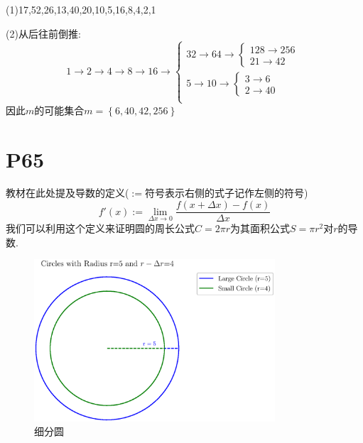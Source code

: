 \documentclass{book}
\begin{document}
    \vspace{2em}

    (1)17,52,26,13,40,20,10,5,16,8,4,2,1

    (2)从后往前倒推:$$1\rightarrow 2\rightarrow 4\rightarrow 8\rightarrow 16\rightarrow \left\{\begin{matrix}
            32\rightarrow 64\rightarrow  \left\{\begin{matrix}
                                                    128\rightarrow 256 \\
                                                    21\rightarrow 42
                                                \end{matrix}\right. \\
            5\rightarrow 10\rightarrow \left\{\begin{matrix}
                                                  3\rightarrow 6 \\
                                                  2\rightarrow 40
                                              \end{matrix}\right.   \\
        \end{matrix}\right. $$
    因此$m$的可能集合$m=\left\{ 6,40,42,256 \right\}$

    \section{\textcolor[rgb]{0.11,0.65,0.52}{P65}}
    教材在此处提及导数的定义($:=$符号表示右侧的式子记作左侧的符号)$$f'(x):=\lim_{\Delta x \to 0} \frac{f(x+\Delta x)-f(x)}{\Delta x} $$
    我们可以利用这个定义来证明圆的周长公式$C=2\pi r$为其面积公式$S=\pi r^2$对$r$的导数.

    \begin{figure}[htbp]
        \centering
        \includegraphics[width=0.8\textwidth]{img/CircleAreaDiverse.eps}
        \caption{细分圆}
    \end{figure}
\end{document}
